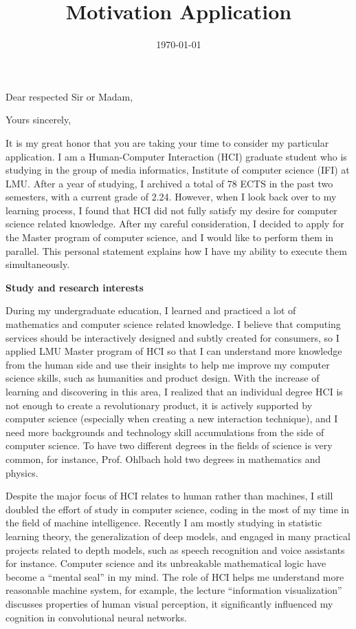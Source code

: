\documentclass[11pt,a4paper,sans]{moderncv}        %
\title{Motivation Application}
\begin{document}
\date{\today}
\opening{Dear respected Sir or Madam,}
\closing{Yours sincerely,}
\makelettertitle


It is my great honor that you are taking your time to consider my particular application. I am a Human-Computer Interaction (HCI) graduate student who is studying in the group of media informatics, Institute of computer science (IFI) at LMU. After a year of studying, I archived a total of 78 ECTS in the past two semesters, with a current grade of 2.24. However, when I look back over to my learning process, I found that HCI did not fully satisfy my desire for computer science related knowledge. After my careful consideration, I decided to apply for the Master program of computer science, and I would like to perform them in parallel. This personal statement explains how I have my ability to execute them simultaneously.

\textbf{Study and research interests}

During my undergraduate education, I learned and practiced a lot of mathematics and computer science related knowledge. I believe that computing services should be interactively designed and subtly created for consumers, so I applied LMU Master program of HCI so that I can understand more knowledge from the human side and use their insights to help me improve my computer science skills, such as humanities and product design. With the increase of learning and discovering in this area, I realized that an individual degree HCI is not enough to create a revolutionary product, it is actively supported by computer science (especially when creating a new interaction technique), and I need more backgrounds and technology skill accumulations from the side of computer science. To have two different degrees in the fields of science is very common, for instance, Prof. Ohlbach hold two degrees in mathematics and physics.

Despite the major focus of HCI relates to human rather than machines, I still doubled the effort of study in computer science, coding in the most of my time in the field of machine intelligence. Recently I am mostly studying in statistic learning theory, the generalization of deep models, and engaged in many practical projects related to depth models, such as speech recognition and voice assistants for instance. Computer science and its unbreakable mathematical logic have become a ``mental seal'' in my mind. The role of HCI helps me understand more reasonable machine system, for example, the lecture ``information visualization'' discusses properties of human visual perception, it significantly influenced my cognition in convolutional neural networks.
\end{document}
